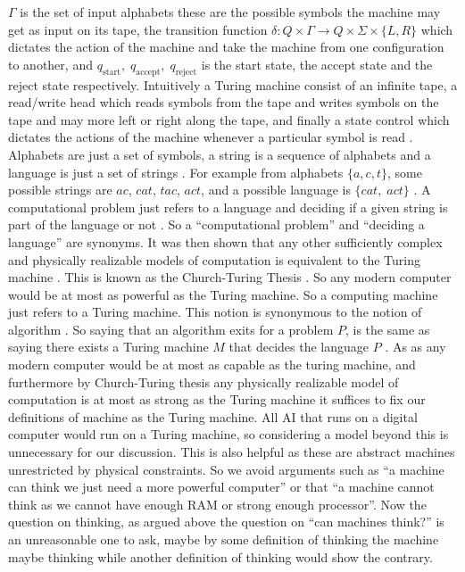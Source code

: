 \documentclass[11pt,a4paper]{article}
\begin{document}
$\Gamma$ is the set of input alphabets these are the possible symbols the machine may get as input on its tape, the transition function $\delta: Q \times \Gamma \to Q \times \Sigma \times \{L,R\}$ which dictates the action of the machine and take the machine from one configuration to another,
and $q_{\text{start}},\; q_{\text{accept}},\; q_{\text{reject}}$ is the start state, the accept state and the reject state respectively\cite{sipser13}.
Intuitively a Turing machine consist of an infinite tape, a read/write head which reads symbols from the tape and writes symbols on the tape and may more left or right along the tape, and finally a state control which dictates the actions of the machine whenever a particular symbol is read \cite{sipser13}\cite{Computerphile}.
Alphabets are just a set of symbols, a string is a sequence of alphabets and a language is just a set of strings \cite{sipser13}. 
For example from alphabets $\{a,c,t\}$, some possible strings are $ac$, $cat$, $tac$, $act$, and a possible language is $\{cat,\;act\}$ \cite{sipser13}. 
A computational problem just refers to a language and deciding if a given string is part of the language or not \cite{sipser13}. So a ``computational problem'' and ``deciding a language'' are synonyms. 
It was then shown that any other sufficiently complex and physically realizable models of computation is equivalent to the Turing machine \cite{Turing37} \cite{Church36} \cite{Kleene37}. This is known as the Church-Turing Thesis \cite{sipser13}. 
So any modern computer would be at most as powerful as the Turing machine. So a computing machine just refers to a Turing machine. This notion is synonymous to the notion of algorithm \cite{Arora}. So saying that an algorithm exits for a problem $P$, is the same as saying there exists a Turing machine $M$ that decides the language $P$ \cite{sipser13}.
As as any modern computer would be at most as capable as the turing machine, and furthermore by Church-Turing thesis any physically realizable model of computation is at most as strong as the Turing machine it suffices to fix our definitions of machine as the Turing machine. 
All AI that runs on a digital computer would run on a Turing machine, so considering a model beyond this is unnecessary for our discussion.
This is also helpful as these are abstract machines unrestricted by physical constraints. So we avoid arguments such as ``a machine can think we just need a more powerful computer'' or that ``a machine cannot think as we cannot have enough RAM or strong enough processor''.
Now the question on thinking, as argued above the question on ``can machines think?'' is an unreasonable one to ask, maybe by some definition of thinking the machine maybe thinking while another definition of thinking would show the contrary. 
\end{document}
